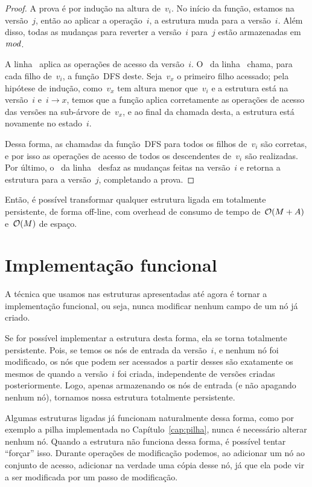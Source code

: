 \documentclass[../../main.tex]{subfiles}
\begin{document}
\begin{proof}
A prova é por indução na altura de~$v_i$. No início da função, estamos na versão~$j$, então ao aplicar a operação~$i$, a estrutura muda para a versão~$i$. Além disso, todas as mudanças para reverter a versão~$i$ para~$j$ estão armazenadas em~$\mathit{mod}$.

A linha~ aplica as operações de acesso da versão~$i$. O~ da linha~ chama, para cada filho de~$v_i$, a função~\textsc{DFS} deste. Seja~$v_x$ o primeiro filho acessado; pela hipótese de indução, como~$v_x$ tem altura menor que~$v_i$ e a estrutura está na versão~$i$ e~${i \rightarrow x}$, temos que a função aplica corretamente as operações de acesso das versões na sub-árvore de~$v_x$, e ao final da chamada desta, a estrutura está novamente no estado~$i$.

Dessa forma, as chamadas da função~\textsc{DFS} para todos os filhos de~$v_i$ são corretas, e por isso as operações de acesso de todos os descendentes de~$v_i$ são realizadas. Por último, o~ da linha~ desfaz as mudanças feitas na versão~$i$ e retorna a estrutura para a versão~$j$, completando a prova.
\end{proof}

Então, é possível transformar qualquer estrutura ligada em totalmente persistente, de forma off-line, com overhead de consumo de tempo de~$\mathcal{O}(M+A)$ e~$\mathcal{O}(M)$ de espaço.

\section{Implementação funcional} \label{sec:implfuncional}

A técnica que usamos nas estruturas apresentadas até agora é tornar a implementação funcional, ou seja, nunca modificar nenhum campo de um nó já criado.

Se for possível implementar a estrutura desta forma, ela se torna totalmente persistente. Pois, se temos os nós de entrada da versão~$i$, e nenhum nó foi modificado, os nós que podem ser acessados a partir desses são exatamente os mesmos de quando a versão~$i$ foi criada, independente de versões criadas posteriormente. Logo, apenas armazenando os nós de entrada (e não apagando nenhum nó), tornamos nossa estrutura totalmente persistente.

Algumas estruturas ligadas já funcionam naturalmente dessa forma, como por exemplo a pilha implementada no Capítulo~\ref{cap:pilha}, nunca é necessário alterar nenhum nó. Quando a estrutura não funciona dessa forma, é possível tentar ``forçar'' isso. Durante operações de modificação podemos, ao adicionar um nó ao conjunto de acesso, adicionar na verdade uma cópia desse nó, já que ela pode vir a ser modificada por um passo de modificação.
\end{document}
